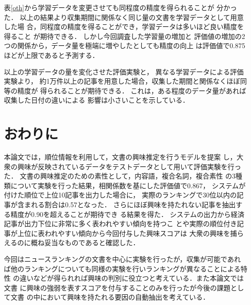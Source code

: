 \documentclass[japanese]{jnlp_1.4}
\begin{document}
表\ref{oth}から学習データを変更させても同程度の精度を得られることが
分かった．
以上の結果より収集期間に関係なく同じ量の文書を学習データとして用意した場
合，同程度の精度を得ることができ，学習データは多いほど良い精度を得ること
が期待できる．
しかし今回調査した学習量の増加と
評価値の増加の2つの関係から，データ量を極端に増やしたとしても精度の向上
は評価値で0.875ほどが上限であると予測する．

以上の学習データの量を変化させた評価実験と，
異なる学習データによる評価実験より，
約1万件以上の記事を用意した場合，収集した期間と関係なくほぼ同等の精度が
得られることが期待できる．
これは，ある程度のデータ量があれば収集した日付の違いによる
影響は小さいことを示している．



\section{おわりに}

本論文では，順位情報を利用して，文書の興味推定を行うモデルを提案
し，大衆の興味が反映されているデータをテストデータとして用いて評価実験を行った．
文書の興味推定のための素性として，内容語，複合名詞，複合素性
の3種類について実験を行った結果，相関係数を基にした評価値で0.867，
システムが付けた順位で上位10記事を出力した場合に，
実際のランキングで30位以内の記事が含まれる割合は0.57となった．
さらにほぼ興味を持たれない記事を抽出する精度が0.90を超えることが期待でき
る結果を得た．
システムの出力から経済記事が出力下位に非常に多く表われやすい傾向を持つこ
とや実際の順位付き記事が上位に表われやすい傾向から今回付与した興味スコアは
大衆の興味を捕らえるのに概ね妥当なものであると確認した．

 今回はニュースランキングの文書を中心に実験を行ったが，収集が可能であれ
ば他のランキングについても同様の実験を行いランキングが異なることによる特性
の違いなどが得られれば興味の判別に役立つと考えている．また本論文では文書
に興味の強弱を表すスコアを付与することのみを行ったが今後の課題として文書
の中において興味を持たれる要因の自動抽出を考えている．
\end{document}

